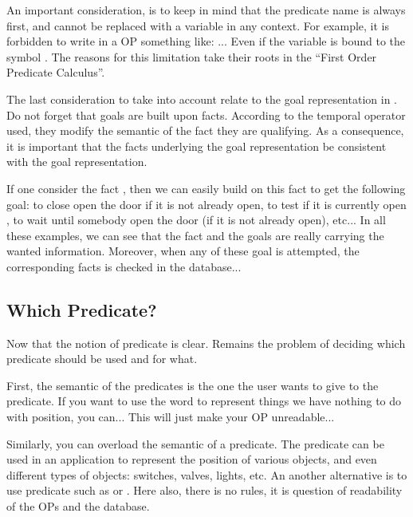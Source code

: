 An important consideration, is to keep in mind that the predicate name is
always first, and cannot be replaced with a variable in any context. For
example, it is forbidden to write in a OP something like: ... Even if the variable  is bound to the symbol .
The reasons for this limitation take their roots in the ``First Order Predicate
Calculus''.

The last consideration to take into account relate to the goal
representation in \COPRS{}. Do not forget that goals are built upon facts.
According to the temporal operator used, they modify the semantic of the
fact they are qualifying. As a consequence, it is important that the
facts underlying the goal representation be consistent with the goal
representation.

If one consider the fact , then we can easily
build on this fact to get the following goal:  to close open the door if it is not already open,  to test if it is currently open ,  to wait until somebody open the door (if it is not
already open), etc... In all these examples, we can see that the fact and
the goals are really carrying the wanted information. Moreover, when any
of these goal is attempted, the corresponding facts is checked in the
database...

\subsection{Which Predicate?}

Now that the notion of predicate is clear. Remains the problem of
deciding which predicate should be used and for what.

First, the semantic of the predicates is the one the user wants to give
to the predicate. If you want to use the word  to
represent things we have nothing to do with position, you can... This will
just make your OP unreadable...

Similarly, you can overload the semantic of a predicate. The predicate
 can be used in an application to represent the position
of various objects, and even different types of objects: switches,
valves, lights, etc. An another alternative is to use predicate such as
 or . Here also, there is no
rules, it is question of readability of the OPs and the database.

